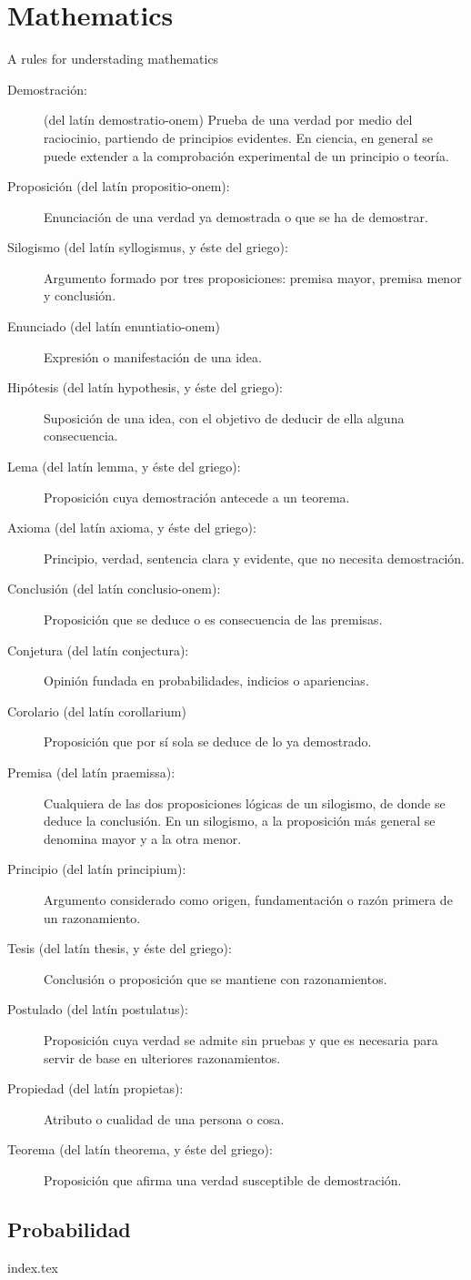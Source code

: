 
\part{Mathematics}

A rules for understading mathematics
\begin{description}
    \item[Demostraci\'on: ] (del lat\'in demostratio-onem) Prueba de una verdad por medio del raciocinio, partiendo de principios evidentes. En ciencia, en general se puede extender a la comprobaci\'on experimental de un principio o teor\'ia.
    \item[Proposici\'on (del lat\'in propositio-onem): ] Enunciaci\'on de una verdad ya demostrada o que se ha de demostrar.
    \item[Silogismo (del lat\'in syllogismus, y \'este del griego): ] Argumento formado por tres proposiciones: premisa mayor, premisa menor y conclusi\'on. 
    \item[Enunciado (del lat\'in enuntiatio-onem)] Expresi\'on o manifestaci\'on de una idea.
    \item[Hip\'otesis (del lat\'in hypothesis, y \'este del griego): ] Suposici\'on de una idea, con el objetivo de deducir de ella alguna consecuencia.
    \item[Lema (del lat\'in lemma, y \'este del griego): ]      Proposici\'on cuya demostraci\'on antecede a un teorema.
    \item[Axioma (del lat\'in axioma, y \'este del griego): ]      Principio, verdad, sentencia clara y evidente, que no necesita demostraci\'on.
    \item[Conclusi\'on (del lat\'in conclusio-onem): ] Proposici\'on que se deduce o es consecuencia de las premisas.
    \item[Conjetura (del lat\'in conjectura): ] Opini\'on fundada en probabilidades, indicios o apariencias.
    \item[ Corolario (del lat\'in corollarium)] Proposici\'on que por s\'i sola se deduce de lo ya demostrado.
    \item[Premisa (del lat\'in praemissa): ]      Cualquiera de las dos proposiciones l\'ogicas de un silogismo, de donde se deduce la conclusi\'on. En un silogismo, a la proposici\'on más general se denomina mayor y a la otra menor.
    \item[ Principio (del lat\'in principium): ] Argumento considerado como origen, fundamentaci\'on o raz\'on primera de un razonamiento.
    \item[ Tesis (del lat\'in thesis, y \'este del griego): ] Conclusi\'on o proposici\'on que se mantiene con razonamientos.
    \item[Postulado (del lat\'in postulatus): ] Proposici\'on cuya verdad se admite sin pruebas y que es necesaria para servir de base en ulteriores razonamientos.
    \item[Propiedad (del lat\'in propietas): ] Atributo o cualidad de una persona o cosa.
    \item[Teorema (del lat\'in theorema, y \'este del griego): ] Proposici\'on que afirma una verdad susceptible de demostraci\'on.    
\end{description}
\chapter{Probabilidad}

{index.tex}